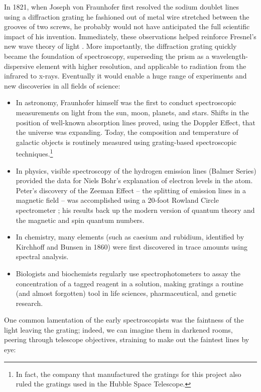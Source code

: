 In 1821, when Joseph von Fraunhofer first resolved the sodium doublet lines using a diffraction grating he fashioned out of metal wire stretched between the grooves of two screws, he probably would not have anticipated the full scientific impact of his invention.
Immediately, these observations helped reinforce Fresnel's new wave theory of light \cite{Fra23}. %
More importantly, the diffraction grating quickly became the foundation of spectroscopy, superseding the prism as a wavelength-dispersive element with higher resolution, and applicable to radiation from the infrared to x-rays.  Eventually it would enable a huge range of experiments and new discoveries in all fields of science:
\begin{itemize}
\item In astronomy, Fraunhofer himself was the first to conduct spectroscopic measurements on light from the sun, moon, planets, and stars.  Shifts in the position of well-known absorption lines proved, using the Doppler Effect, that the universe was expanding.  Today, the composition and temperature of galactic objects is routinely measured using grating-based spectroscopic techniques.\footnote{In fact, the company that manufactured the gratings for this project also ruled the gratings used in the Hubble Space Telescope.}
\item In physics, visible spectroscopy of the hydrogen emission lines (Balmer Series) provided the data for Niels Bohr's explanation of electron levels in the atom.  Peter's discovery of the Zeeman Effect -- the splitting of emission lines in a magnetic field -- was accomplished using a 20-foot Rowland Circle spectrometer \cite{Zee97}; his results back up the modern version of quantum theory and the magnetic and spin quantum numbers.
\item In chemistry, many elements (such as caesium and rubidium, identified by Kirchhoff and Bunsen in 1860) were first discovered in trace amounts using spectral analysis.
\item Biologists and biochemists regularly use spectrophotometers to assay the concentration of a tagged reagent in a solution, making gratings a routine (and almost forgotten) tool in life sciences, pharmaceutical, and genetic research.
\end{itemize}

One common lamentation of the early spectroscopists was the faintness of the light leaving the grating; indeed, we can imagine them in darkened rooms, peering through telescope objectives,  straining to make out the faintest lines by eye:

